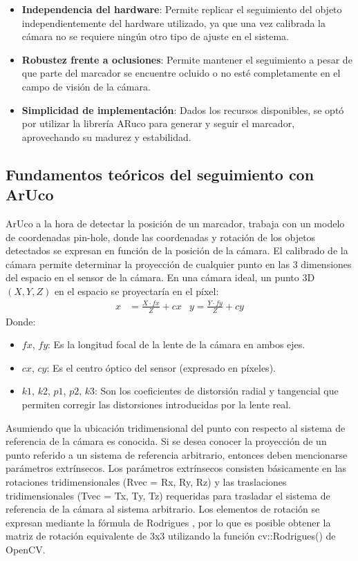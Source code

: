 \begin{itemize}
    \item \textbf{Independencia del hardware}: Permite replicar el seguimiento del objeto independientemente del hardware utilizado, ya que una vez calibrada la cámara no se requiere ningún otro tipo de ajuste en el sistema.
    \item \textbf{Robustez frente a oclusiones}: Permite mantener el seguimiento a pesar de que parte del marcador se encuentre ocluido o no esté completamente en el campo de visión de la cámara.
    \item \textbf{Simplicidad de implementación}: Dados los recursos disponibles, se optó por utilizar la librería ARuco para generar y seguir el marcador, aprovechando su madurez y estabilidad.
\end{itemize}

\subsection{Fundamentos teóricos del seguimiento con ArUco}

ArUco a la hora de detectar la posición de un marcador, trabaja con un modelo de coordenadas pin-hole, donde las coordenadas y rotación de los objetos detectados se expresan en función de la posición de la cámara.
El calibrado de la cámara permite determinar la proyección de cualquier punto en las 3 dimensiones del espacio en el sensor de la cámara. En una cámara ideal, un punto 3D $(X, Y, Z)$ en el espacio se proyectaría en el píxel:
\begin{align*}
	x & = \frac{X \cdot fx}{Z} + cx & y = \frac{Y \cdot fy}{Z} + cy
\end{align*}
Donde:
\begin{itemize}
	\item $fx$, $fy$: Es la longitud focal de la lente de la cámara en ambos ejes.
	\item $cx$, $cy$: Es el centro óptico del sensor (expresado en píxeles).
	\item $k1$, $k2$, $p1$, $p2$, $k3$: Son los coeficientes de distorsión radial y tangencial que permiten corregir las distorsiones introducidas por la lente real.
\end{itemize}
Asumiendo que la ubicación tridimensional del punto con respecto al sistema de referencia de la cámara es conocida. Si se desea conocer la proyección de un punto referido a un sistema de referencia arbitrario, entonces deben mencionarse parámetros extrínsecos. Los parámetros extrínsecos consisten básicamente en las rotaciones tridimensionales (Rvec = {Rx, Ry, Rz}) y las traslaciones tridimensionales (Tvec = {Tx, Ty, Tz}) requeridas para trasladar el sistema de referencia de la cámara al sistema arbitrario. Los elementos de rotación se expresan mediante la fórmula de Rodrigues \cite{mebius2007derivation}, por lo que es posible obtener la matriz de rotación equivalente de 3x3 utilizando la función cv::Rodrigues() de OpenCV.

